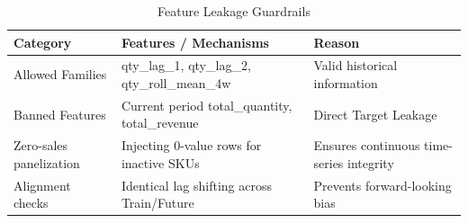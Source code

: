 \begin{table}[htbp]
\centering
\caption{Feature Leakage Guardrails}
\label{tab:feature_guardrails}
\begin{tabular}{lll}
\toprule
\textbf{Category} & \textbf{Features / Mechanisms} & \textbf{Reason} \\
\midrule
Allowed Families & qty\_lag\_1, qty\_lag\_2, qty\_roll\_mean\_4w & Valid historical information \\
Banned Features & Current period total\_quantity, total\_revenue & Direct Target Leakage \\
Zero-sales panelization & Injecting 0-value rows for inactive SKUs & Ensures continuous time-series integrity \\
Alignment checks & Identical lag shifting across Train/Future & Prevents forward-looking bias \\
\bottomrule
\end{tabular}
\end{table}
